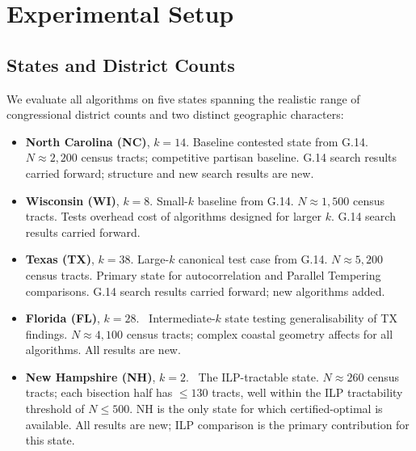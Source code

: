 \section{Experimental Setup}
\label{sec:setup}

\subsection{States and District Counts}

We evaluate all algorithms on five states spanning the realistic range of
congressional district counts and two distinct geographic characters:

\begin{itemize}
  \item \textbf{North Carolina (NC)}, $k = 14$.
        Baseline contested state from G.14.
        $N \approx 2{,}200$ census tracts; competitive partisan baseline.
        G.14 search results carried forward; structure and new search
        results are new.

  \item \textbf{Wisconsin (WI)}, $k = 8$.
        Small-$k$ baseline from G.14.
        $N \approx 1{,}500$ census tracts.
        Tests overhead cost of algorithms designed for larger $k$.
        G.14 search results carried forward.

  \item \textbf{Texas (TX)}, $k = 38$.
        Large-$k$ canonical test case from G.14.
        $N \approx 5{,}200$ census tracts.
        Primary state for autocorrelation and Parallel Tempering comparisons.
        G.14 search results carried forward; new algorithms added.

  \item \textbf{Florida (FL)}, $k = 28$.~\dag{}
        Intermediate-$k$ state testing generalisability of TX findings.
        $N \approx 4{,}100$ census tracts; complex coastal geometry
        affects \pp{} for all algorithms.
        All results are new.

  \item \textbf{New Hampshire (NH)}, $k = 2$.~\dag{}
        The ILP-tractable state.
        $N \approx 260$ census tracts; each bisection half has $\leq 130$
        tracts, well within the ILP tractability threshold of $N \leq 500$.
        NH is the only state for which certified-optimal \ec{} is available.
        All results are new; ILP comparison is the primary contribution
        for this state.
\end{itemize}

